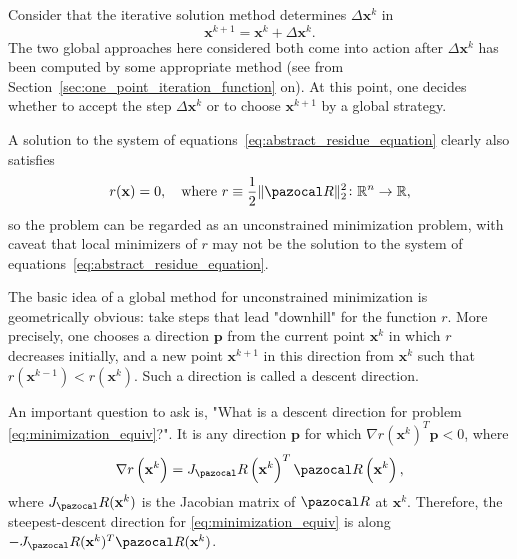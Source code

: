 Consider that the iterative solution method determines \(\Delta \mathbf x^k\) in
\begin{equation} \label{eq:general_update_equation}
  \mathbf x^{k+1} = \mathbf x^k + \Delta \mathbf x^k.
\end{equation}
The two global approaches here considered both come into action after \(\Delta \mathbf x^k\) has been computed by some appropriate method (see from Section~\ref{sec:one_point_iteration_function} on).
At this point, one decides whether to accept the step \(\Delta \mathbf x^k\) or to choose \(\mathbf x^{k+1}\) by a global strategy.

A solution to the system of equations~\eqref{eq:abstract_residue_equation} clearly also satisfies
\begin{equation} \label{eq:minimization_equiv}
  r(\mathbf x) = 0,\quad\text{where }r \equiv \frac{1}{2} \|\pazocal R\|^2_2\colon \mathbb R^n\to \mathbb R,
\end{equation}
so the problem can be regarded as an unconstrained minimization problem, with caveat that local minimizers of \(r\) may not be the solution to the system of equations~\eqref{eq:abstract_residue_equation}.

The basic idea of a global method for unconstrained minimization is geometrically obvious: take steps that lead "downhill" for the function \(r\).
More precisely, one chooses a direction \(\mathbf p\) from the current point \(\mathbf x^{k}\) in which \(r\) decreases initially, and a new point \(\mathbf x^{k+1}\) in this direction from \(\mathbf x^k\) such that \(r(\mathbf x^{k-1})<r(\mathbf x^k)\).
Such a direction is called a descent direction.

An important question to ask is, "What is a descent direction for problem \eqref{eq:minimization_equiv}?".
It is any direction \(\mathbf p\) for which \(\nabla r(\mathbf x^k)^{T} \mathbf p<0\), where
\begin{equation}
  \nabla r\left(\mathbf x^k\right)=J_\pazocal R\left(\mathbf x^k\right)^{T} \pazocal R\left(\mathbf x^k\right),
\end{equation}
where \(J_\pazocal R(\mathbf x^k)\) is the Jacobian matrix of \(\pazocal R\) at \(\mathbf x^k\).
Therefore, the steepest-descent direction for \eqref{eq:minimization_equiv} is along \(-J_\pazocal R(\mathbf x^{k})^{T} \pazocal R(\mathbf x^k)\).


